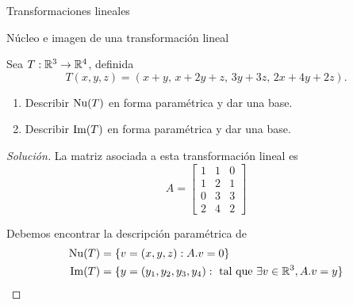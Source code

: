 \begin{chapter}{Transformaciones lineales}
\begin{section}{N\'ucleo e imagen de una transformaci\'on lineal}
        
\begin{ejemplo*}
        Sea $T: \mathbb R^3 \to \mathbb R^4$, definida
        $$
        T(x,y,z) = (x +y ,\,x +2y +z,\,3y +3z,\,2x +4y +2z).
        $$
        \begin{enumerate}
            \item Describir $\operatorname{Nu}(T)$  en forma paramétrica y dar una base.
            \item Describir $\operatorname{Im}(T)$  en forma paramétrica y  dar una base. 
        \end{enumerate}
        \end{ejemplo*}
\begin{proof}[Solución]
    La matriz asociada a esta transformación lineal  es 
    \begin{equation*}
        A = \begin{bmatrix}
        1&1&0\\1&2&1\\0&3&3\\2&4&2
        \end{bmatrix}
    \end{equation*}

    Debemos encontrar la descripción paramétrica de
    \begin{align*}
        \operatorname{Nu}(T) &= \{v=(x,y,z):   A.{v}=0\}\\
        \operatorname{Im}(T) &= \{y= (y_1,y_2,y_3,y_4): \text{ tal que } \exists v \in \mathbb R^3, A.{v} = {y}  \}
        \end{align*}


\end{proof}
\end{section}
\end{chapter}
